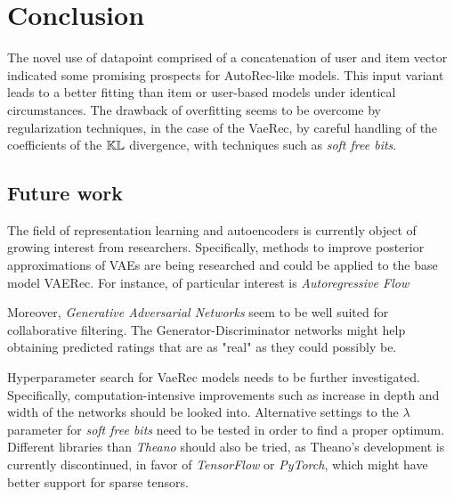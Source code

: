 \chapter{Conclusion}

The novel use of datapoint comprised of a concatenation of user and item vector indicated
some promising prospects for AutoRec-like models. This input variant
leads to a better fitting than item or user-based models under identical circumstances.
The drawback of overfitting seems to be overcome by 
regularization techniques, in the case of the VaeRec, by careful handling of the
coefficients of the $\mathbb{KL}$ divergence, with techniques such as \emph{soft free bits}.

\section{Future work}

The field of representation learning and autoencoders is currently object of
growing interest from researchers. Specifically, methods to improve posterior
approximations of VAEs are being researched and could be applied to the base model
VAERec. For instance, of particular interest is \emph{Autoregressive Flow}
\cite{autoregressive_flow}

Moreover, \emph{Generative Adversarial Networks} \cite{GAN} seem to be well suited 
for collaborative filtering. The Generator-Discriminator networks might help
obtaining predicted ratings that are as "real" as they could possibly be.

Hyperparameter search for VaeRec models needs to be further
investigated. Specifically, computation-intensive improvements
such as increase in depth and width of the networks should be looked into.
Alternative settings to the $\lambda$ parameter for \emph{soft free bits}
need to be tested in order to find a proper optimum.
Different libraries than \emph{Theano}\cite{theano} should also be tried, as Theano's
development is currently discontinued, in favor of \emph{TensorFlow}\cite{tensorflow}
or \emph{PyTorch}\cite{pytorch}, which might have better support for sparse tensors.
